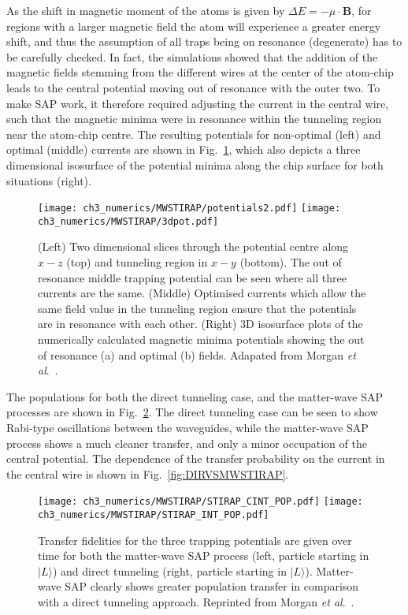 As the shift in magnetic moment of the atoms is given by $\Delta E = -\mu\cdot\mathbf{B}$, for regions with a larger magnetic field the atom will experience a greater energy shift, and thus the assumption of all traps being on resonance (degenerate) has to be carefully checked. In fact, the simulations showed that the addition of the magnetic fields stemming from the different wires at the center of the atom-chip leads to the central potential moving out of resonance with the outer two. To make SAP work, it therefore required adjusting the current in the central wire, such that the magnetic minima were in resonance within the tunneling region near the atom-chip centre. The resulting potentials for non-optimal (left) and optimal (middle) currents are shown in Fig.~\ref{fig:equaloptcurrent}, which also depicts a three dimensional isosurface of the potential minima along the chip surface for both situations (right).

\begin{figure}[tb]
    \centering
  \texttt{[image: ch3\_numerics/MWSTIRAP/potentials2.pdf]}
  \texttt{[image: ch3\_numerics/MWSTIRAP/3dpot.pdf]}
  \caption{(Left) Two dimensional slices through the potential centre along $x-z$ (top) and tunneling region in $x-y$ (bottom). The out of resonance middle trapping potential can be seen where all three currents are the same. (Middle) Optimised currents which allow the same field value in the tunneling region ensure that the potentials are in resonance with each other. (Right) 3D isosurface plots of the numerically calculated magnetic minima potentials showing the out of resonance (a) and optimal (b) fields. Adapated from Morgan {\textit{et al}.}~\cite{AO:Morgan_pra_2013}.}
  \label{fig:equaloptcurrent}
\end{figure}
The populations for both the direct tunneling case, and the matter-wave SAP processes are shown in Fig.~\ref{fig:mwsVsDT}. The direct tunneling case can be seen to show Rabi-type oscillations between the waveguides, while the matter-wave SAP process shows a much cleaner transfer, and only a minor occupation of the central potential. The dependence of the transfer probability on the current in the central wire is shown in Fig.~\ref{fig:DIRVSMWSTIRAP}.


\begin{figure}[tb]
    \centering
  \texttt{[image: ch3\_numerics/MWSTIRAP/STIRAP\_CINT\_POP.pdf]}
  \texttt{[image: ch3\_numerics/MWSTIRAP/STIRAP\_INT\_POP.pdf]}
  \caption{Transfer fidelities for the three trapping potentials are given over time for both the matter-wave SAP process (left, particle starting in $ |L\rangle$) and direct tunneling (right, particle starting in $ |L\rangle$). Matter-wave SAP clearly shows greater population transfer in comparison with a direct tunneling approach. Reprinted from Morgan {\textit{et al}.}~\cite{AO:Morgan_pra_2013}.}
  \label{fig:mwsVsDT}
\end{figure}


